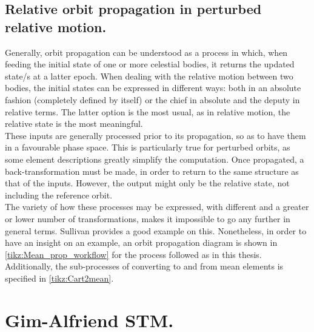 	\subsection{Relative orbit propagation in perturbed relative motion.}
	\indent Generally, orbit propagation can be understood as a process in which, when feeding the initial state of one or more celestial bodies, it returns the updated state/s at a latter epoch. When dealing with the relative motion between two bodies, the initial states can be expressed in different ways: both in an absolute fashion (\ie completely defined by itself) or the chief in absolute and the deputy in relative terms. The latter option is the most usual, as in relative motion, the relative state is the most meaningful. \\
	\indent These inputs are generally processed prior to its propagation, so as to have them in a favourable phase space. This is particularly true for perturbed orbits, as some element descriptions greatly simplify the computation. Once propagated, a back-transformation must be made, in order to return to the same structure as that of the inputs. However, the output might only be the relative state, not including the reference orbit. \\
	\indent The variety of how these processes may be expressed, with different and a greater or lower number of transformations, makes it impossible to go any further in general terms. Sullivan \cite{Sullivan} provides a good example on this. Nonetheless, in order to have an insight on an example, an orbit propagation diagram is shown in \ref{tikz:Mean_prop_workflow} for the process followed as in this thesis. Additionally, the sub-processes of converting to and from mean elements is specified in \ref{tikz:Cart2mean}.
	
	
\section{Gim-Alfriend STM.}\label{secCh5:GA_STM}
%
